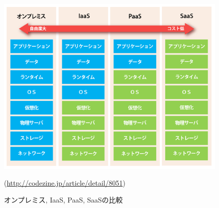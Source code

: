 \begin{figure}
\begin{center}
\includegraphics[width=16cm]{fig/paas.png}
\caption{オンプレミス, IaaS, PaaS, SaaSの比較}
\end{center}
\begin{flushright}
(\url{http://codezine.jp/article/detail/8051})
\end{flushright}
\end{figure}

